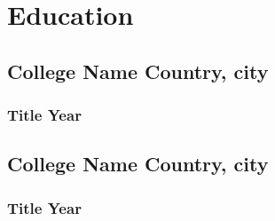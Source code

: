 \section{Education}

\subsection{College Name  \hfill Country, city}
\subsubsection{Title \hfill Year} \bigskip 

\subsection{College Name  \hfill Country, city}
\subsubsection{Title \hfill Year} \bigskip 